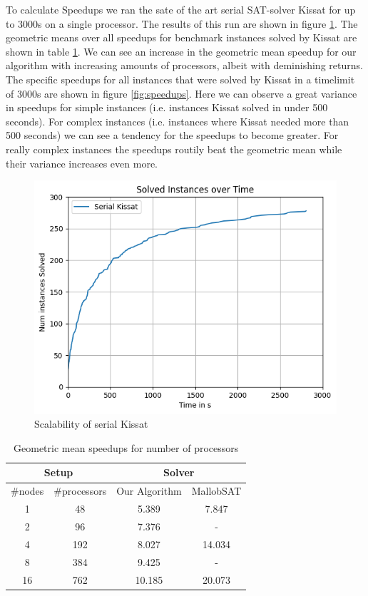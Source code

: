 \documentclass[12pt,a4paper,twoside]{scrartcl}
\numberwithin{equation}{section}
\begin{document}
To calculate Speedups we ran the sate of the art serial SAT-solver Kissat for up to 3000s on a single processor. The results of this run are shown in figure \ref{fig:runtimeSerial}. The geometric means over all speedups for benchmark instances solved by Kissat are shown in table \ref{tab:speedups}. We can see an increase in the geometric mean speedup for our algorithm with increasing amounts of processors, albeit with deminishing returns. The specific speedups for all instances that were solved by Kissat in a timelimit of 3000s are shown in figure \ref{fig:speedups}. Here we can observe a great variance in speedups for simple instances (i.e. instances Kissat solved in under 500 seconds). For complex instances (i.e. instances where Kissat needed more than 500 seconds) we can see a tendency for the speedups to become greater. For really complex instances the speedups routily beat the geometric mean while their variance increases even more.

\begin{figure}
  \center
  \includegraphics{plots/cumulative_runtime/runtime_serial.png}
  \caption{Scalability of serial Kissat}
  \label{fig:runtimeSerial}
\end{figure}

\begin{table}
  \center
  \begin{tabular}{ c|c|c|c }
    \multicolumn{2}{c|}{Setup} & \multicolumn{2}{c}{Solver}\\
    \hline
    \#nodes   & \#processors   & Our Algorithm  & MallobSAT \\
    \hline
    1  & 48  & 5.389  & 7.847\\
    \hline
    2  & 96  & 7.376   & -\\
    \hline
    4  & 192 & 8.027   & 14.034\\
    \hline
    8  & 384 & 9.425    & -\\
    \hline
    16 & 762 & 10.185   & 20.073
  \end{tabular}
  \caption{Geometric mean speedups for number of processors}
  \label{tab:speedups}
\end{table}
\end{document}
